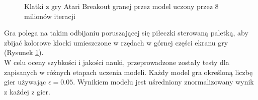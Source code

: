\documentclass[12pt]{article}
\begin{document}
\begin{figure}[H]%
\centering
{}%
\qquad
{}%
\qquad
{}%

\caption{Klatki z gry Atari Breakout granej przez model uczony przez 8 milionów iteracji}
\label{atari1}
\end{figure}



Gra polega na takim odbijaniu poruszającej się piłeczki sterowaną paletką, aby zbijać kolorowe klocki umieszczone w rzędach w górnej części ekranu gry (Rysunek \ref{atari1}).
\\
W celu oceny szybkości i jakości nauki, przeprowadzone zostały testy dla zapisanych w różnych etapach uczenia modeli. Każdy model gra określoną liczbę gier używając $\epsilon=0.05$. Wynikiem modelu jest uśredniony znormalizowany wynik z każdej z gier. 
\end{document}
